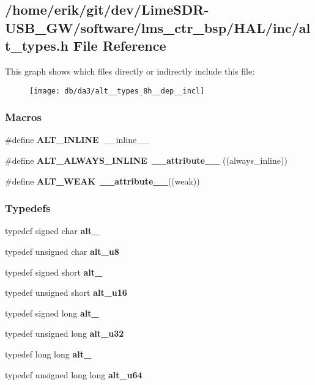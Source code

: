 \subsection{/home/erik/git/dev/\+Lime\+S\+D\+R-\/\+U\+S\+B\+\_\+\+G\+W/software/lms\+\_\+ctr\+\_\+bsp/\+H\+A\+L/inc/alt\+\_\+types.h File Reference}
\label{alt__types_8h}
This graph shows which files directly or indirectly include this file\+:
\nopagebreak
\begin{figure}[H]
\begin{center}
\leavevmode
\texttt{[image: db/da3/alt\_\_types\_8h\_\_dep\_\_incl]}
\end{center}
\end{figure}
\subsubsection*{Macros}
\begin{DoxyCompactItemize}
\item 
\#define {\bf A\+L\+T\+\_\+\+I\+N\+L\+I\+NE}~\+\_\+\+\_\+inline\+\_\+\+\_\+
\item 
\#define {\bf A\+L\+T\+\_\+\+A\+L\+W\+A\+Y\+S\+\_\+\+I\+N\+L\+I\+NE}~{\bf \+\_\+\+\_\+attribute\+\_\+\+\_\+} ((always\+\_\+inline))
\item 
\#define {\bf A\+L\+T\+\_\+\+W\+E\+AK}~{\bf \+\_\+\+\_\+attribute\+\_\+\+\_\+}((weak))
\end{DoxyCompactItemize}
\subsubsection*{Typedefs}
\begin{DoxyCompactItemize}
\item 
typedef signed char {\bf alt\+\_}
\item 
typedef unsigned char {\bf alt\+\_\+u8}
\item 
typedef signed short {\bf alt\+\_}
\item 
typedef unsigned short {\bf alt\+\_\+u16}
\item 
typedef signed long {\bf alt\+\_}
\item 
typedef unsigned long {\bf alt\+\_\+u32}
\item 
typedef long long {\bf alt\+\_}
\item 
typedef unsigned long long {\bf alt\+\_\+u64}
\end{DoxyCompactItemize}



